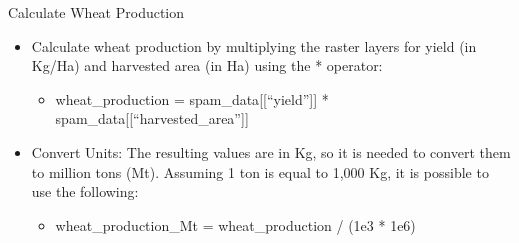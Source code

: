 \documentclass[
  ignorenonframetext,
  aspectratio=169,
]{beamer}
\providecommand{\tightlist}{%
  \setlength{\itemsep}{0pt}\setlength{\parskip}{0pt}}\usepackage{longtable,booktabs,array}
\begin{document}
\begin{frame}{Calculate Wheat Production}
\protect\hypertarget{calculate-wheat-production}{}
\begin{itemize}[<+->]
\item
  Calculate wheat production by multiplying the raster layers for yield
  (in Kg/Ha) and harvested area (in Ha) using the * operator:

  \begin{itemize}[<+->]
  \tightlist
  \item
    wheat\_production = spam\_data{[}{[}``yield''{]}{]} *
    spam\_data{[}{[}``harvested\_area''{]}{]}
  \end{itemize}
\item
  Convert Units: The resulting values are in Kg, so it is needed to
  convert them to million tons (Mt). Assuming 1 ton is equal to 1,000
  Kg, it is possible to use the following:

  \begin{itemize}[<+->]
  \tightlist
  \item
    wheat\_production\_Mt = wheat\_production / (1e3 * 1e6)
  \end{itemize}
\end{itemize}
\end{frame}
\end{document}
